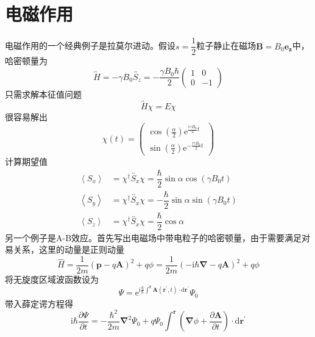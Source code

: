 \documentclass[12pt, a4paper, oneside]{ctexart}
\begin{document}
	\section{电磁作用}
	电磁作用的一个经典例子是拉莫尔进动。假设$s=\dfrac{1}{2}$粒子静止在磁场$\boldsymbol{B}=B_{0}\boldsymbol{e_{z}}$中，哈密顿量为
	\begin{equation}
		\overleftrightarrow{H}=-\gamma B_{0}\overleftrightarrow{S_{z}}=-\dfrac{\gamma B_{0}\hbar}{2}\begin{pmatrix}
			1	& 0\\
			0	&-1
		\end{pmatrix}
	\end{equation}
	\quad\quad 只需求解本征值问题
	\begin{equation}
		\overleftrightarrow{H}\chi=E\chi
	\end{equation}
	\quad\quad 很容易解出
	\begin{equation}
		\chi(t)=\begin{pmatrix}
		\cos(\frac{\alpha}{2})\mathrm{e}^{\frac{\mathrm{i}\gamma B_{0}}{2}t}	\\\sin(\frac{\alpha}{2})\mathrm{e}^{-\frac{\mathrm{i}\gamma B_{0}}{2}t}
		\end{pmatrix}
	\end{equation}
	\quad\quad 计算期望值
	\begin{align}
		\left<S_{x}\right>&=\chi^{\dagger}\overleftrightarrow{S_{x}}\chi=\dfrac{\hbar}{2}\sin\alpha\cos\left(\gamma B_{0}t\right)\\
		\left<S_{y}\right>&=\chi^{\dagger}\overleftrightarrow{S_{x}}\chi=-\dfrac{\hbar}{2}\sin\alpha\sin\left(\gamma B_{0}t\right)\\
		\left<S_{z}\right>&=\chi^{\dagger}\overleftrightarrow{S_{x}}\chi=\dfrac{\hbar}{2}\cos\alpha
	\end{align}
	\quad\quad 另一个例子是A-B效应。首先写出电磁场中带电粒子的哈密顿量，由于需要满足对易关系，这里的动量是正则动量
	\begin{equation}
		\hat{H}=\dfrac{1}{2m}\left(\boldsymbol{p}-q\boldsymbol{A}\right)^{2}+q\phi=\dfrac{1}{2m}\left(-\mathrm{i}\hbar\boldsymbol{\nabla}-q\boldsymbol{A}\right)^{2}+q\phi
	\end{equation}
	\quad\quad 将无旋度区域波函数设为
	\begin{equation}
		\Psi=\mathrm{e}^{\mathrm{i}\frac{q}{\hbar}\int^{\boldsymbol{r}}\boldsymbol{A}(\boldsymbol{r^{'}},t)\cdot\mathrm{d}\boldsymbol{r^{'}}}\Psi_{0}
	\end{equation}
	\quad\quad 带入薛定谔方程得
	\begin{equation}
		\mathrm{i}\hbar\dfrac{\partial\Psi}{\partial t}=-\dfrac{\hbar^{2}}{2m}\boldsymbol{\nabla}^{2}\Psi_{0}+q\Psi_{0}\int^{\boldsymbol{r}}\left(\boldsymbol{\nabla}\phi+\dfrac{\partial\boldsymbol{A}}{\partial t}\right)\cdot\mathrm{d}\boldsymbol{r^{'}}
	\end{equation}
\end{document}
